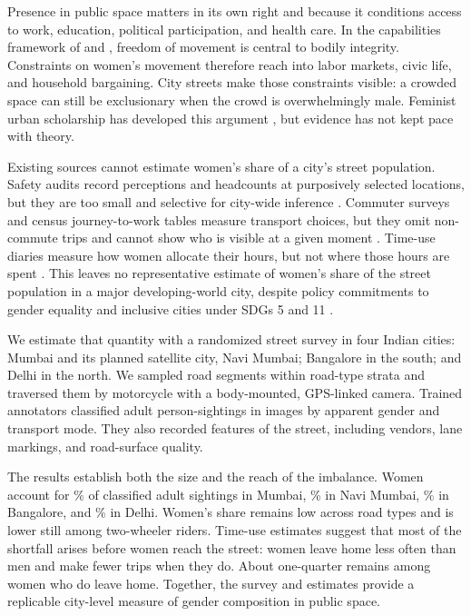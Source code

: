 \documentclass[12pt]{article}
\begin{document}
Presence in public space matters in its own right and because it conditions access to work, education, political participation, and health care. In the capabilities framework of \citet{sen1999} and \citet{nussbaum2000}, freedom of movement is central to bodily integrity. Constraints on women's movement therefore reach into labor markets, civic life, and household bargaining. City streets make those constraints visible: a crowded space can still be exclusionary when the crowd is overwhelmingly male. Feminist urban scholarship has developed this argument \citep{phadke2011, kern2020}, but evidence has not kept pace with theory.

Existing sources cannot estimate women's share of a city's street population. Safety audits record perceptions and headcounts at purposively selected locations, but they are too small and selective for city-wide inference \citep{habitat2008women, jagori2010, safetipin2015, unwomen2021safetyaudit}. Commuter surveys and census journey-to-work tables measure transport choices, but they omit non-commute trips and cannot show who is visible at a given moment \citep{census2011}. Time-use diaries measure how women allocate their hours, but not where those hours are spent \citep{nsso2024tus}. This leaves no representative estimate of women's share of the street population in a major developing-world city, despite policy commitments to gender equality and inclusive cities under SDGs 5 and 11 \citep{un2016}.

We estimate that quantity with a randomized street survey in four Indian cities: Mumbai and its planned satellite city, Navi Mumbai; Bangalore in the south; and Delhi in the north. We sampled road segments within road-type strata and traversed them by motorcycle with a body-mounted, GPS-linked camera. Trained annotators classified \TotalPersonSightings{} adult person-sightings in \TotalImages{} images by apparent gender and transport mode. They also recorded features of the street, including vendors, lane markings, and road-surface quality.

The results establish both the size and the reach of the imbalance. Women account for \MumbaiAllModeShare\% of classified adult sightings in Mumbai, \NaviMumbaiAllModeShare\% in Navi Mumbai, \BangaloreAllModeShare\% in Bangalore, and \DelhiAllModeShare\% in Delhi. Women's share remains low across road types and is lower still among two-wheeler riders. Time-use estimates suggest that most of the shortfall arises before women reach the street: women leave home less often than men and make fewer trips when they do. About one-quarter remains among women who do leave home. Together, the survey and estimates provide a replicable city-level measure of gender composition in public space.
\end{document}
